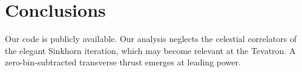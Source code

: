 \section{Conclusions}\label{sec:conclusions}

Our code is publicly available. Our analysis neglects the celestial
correlators of the elegant Sinkhorn iteration, which may become relevant
at the Tevatron. A zero-bin-subtracted transverse thrust emerges at
leading power.

